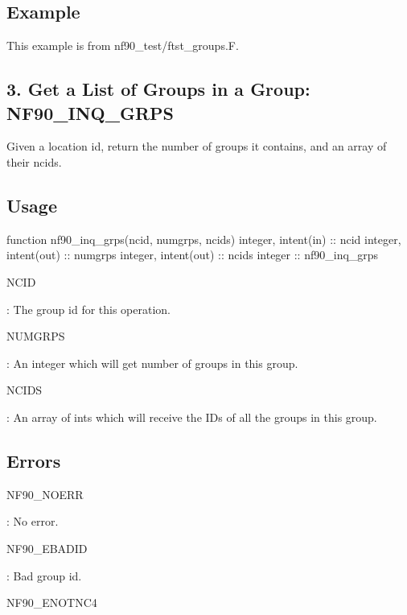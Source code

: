 \subsection*{Example}

This example is from nf90\+\_\+test/ftst\+\_\+groups.\+F.\hypertarget{f90_groups_f90-get-a-list-of-groups-in-a-group-nf90_inq_grps}{}\subsection{3. Get a List of Groups in a Group\+: N\+F90\+\_\+\+I\+N\+Q\+\_\+\+G\+R\+P\+S }\label{f90_groups_f90-get-a-list-of-groups-in-a-group-nf90_inq_grps}
Given a location id, return the number of groups it contains, and an array of their ncids.

\subsection*{Usage}


\begin{DoxyCode}
\textcolor{keyword}{function }nf90\_inq\_grps(ncid, numgrps, ncids)
  \textcolor{keywordtype}{integer}, \textcolor{keywordtype}{intent(in)} :: ncid
  \textcolor{keywordtype}{integer}, \textcolor{keywordtype}{intent(out)} :: numgrps
  \textcolor{keywordtype}{integer}, \textcolor{keywordtype}{intent(out)} :: ncids
  \textcolor{keywordtype}{integer} :: nf90\_inq\_grps
\end{DoxyCode}


{\ttfamily N\+C\+ID}

\+: The group id for this operation.

{\ttfamily N\+U\+M\+G\+R\+PS}

\+: An integer which will get number of groups in this group.

{\ttfamily N\+C\+I\+DS}

\+: An array of ints which will receive the I\+Ds of all the groups in this group.

\subsection*{Errors}

{\ttfamily N\+F90\+\_\+\+N\+O\+E\+RR}

\+: No error.

{\ttfamily N\+F90\+\_\+\+E\+B\+A\+D\+ID}

\+: Bad group id.

{\ttfamily N\+F90\+\_\+\+E\+N\+O\+T\+N\+C4}

